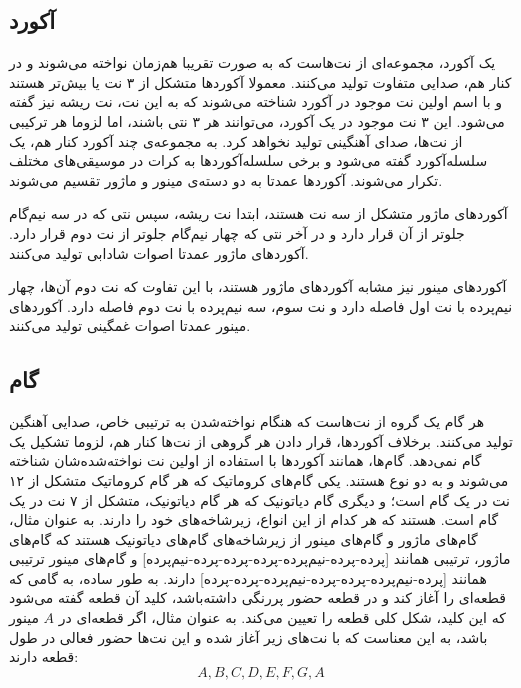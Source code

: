 \subsection{
آکورد
}

یک آکورد، مجموعه‌ای از نت‌هاست که به صورت تقریبا هم‌زمان نواخته می‌شوند و در کنار هم، صدایی متفاوت تولید می‌کنند.
معمولا آکوردها متشکل از ۳ نت یا بیش‌تر هستند و با اسم اولین نت موجود در آکورد شناخته می‌شوند که به این نت، نت ریشه نیز گفته می‌شود. این ۳ نت موجود در یک آکورد، می‌توانند هر ۳ نتی باشند، اما لزوما هر ترکیبی از نت‌ها، صدای آهنگینی تولید نخواهد کرد.
به مجموعه‌ی چند آکورد کنار هم، یک سلسله‌آکورد گفته می‌شود و برخی سلسله‌آکوردها به کرات در موسیقی‌های مختلف تکرار می‌شوند.
آکوردها عمدتا به دو دسته‌ی مینور و ماژور تقسیم می‌شوند.

آکوردهای ماژور متشکل از سه نت هستند، ابتدا نت ریشه، سپس نتی که در سه نیم‌گام جلوتر از آن قرار دارد و در آخر نتی که چهار نیم‌گام جلوتر از نت دوم قرار دارد. آکوردهای ماژور عمدتا اصوات شادابی تولید می‌کنند.

آکوردهای مینور نیز مشابه آکوردهای ماژور هستند، با این تفاوت که نت دوم آن‌ها، چهار نیم‌پرده با نت اول فاصله دارد و نت سوم، سه نیم‌پرده با نت دوم فاصله دارد.
آکوردهای مینور عمدتا اصوات غمگینی تولید می‌کنند.

\subsection{
گام
}
هر گام یک گروه از نت‌هاست که هنگام نواخته‌شدن به ترتیبی خاص، صدایی آهنگین تولید می‌کنند. برخلاف آکوردها، قرار دادن هر گروهی از نت‌ها کنار هم، لزوما تشکیل یک گام نمی‌دهد.
گام‌ها، همانند آکوردها با استفاده از اولین نت نواخته‌شده‌شان شناخته می‌شوند و به دو نوع هستند. یکی
گام‌های کروماتیک  که هر گام کروماتیک متشکل از ۱۲ نت در یک گام است؛
و دیگری گام دیاتونیک که هر گام دیاتونیک، متشکل از ۷ نت در یک گام است.
هستند که هر کدام از این انواع، زیرشاخه‌های خود را دارند. به عنوان مثال، گام‌های ماژور و گام‌های مینور از زیرشاخه‌های گام‌های دیاتونیک هستند که گام‌های ماژور، ترتیبی همانند
[پرده-پرده-نیم‌پرده-پرده-پرده-پرده-نیم‌پرده]
و گام‌های مینور ترتیبی همانند
[پرده-نیم‌پرده-پرده-پرده-نیم‌پرده-پرده-پرده] دارند.
به طور ساده، به گامی که قطعه‌ای را آغاز کند و در قطعه حضور پررنگی داشته‌باشد، کلید آن قطعه گفته می‌شود که این کلید، شکل کلی قطعه را تعیین می‌کند.
به عنوان مثال، اگر قطعه‌ای در
$A$
مینور باشد، به این معناست که با نت‌های زیر آغاز شده و این نت‌ها حضور فعالی در طول قطعه دارند:
\begin{equation}
    A, B, C, D, E, F, G, A
\end{equation}
